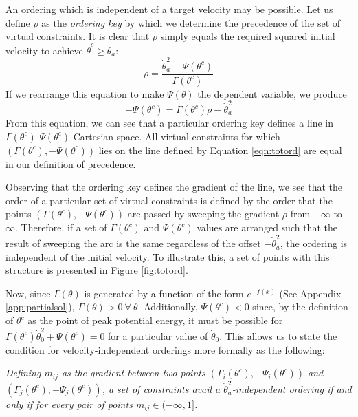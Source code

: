 An ordering which is independent of a target velocity may be possible. Let us define $\rho$ as the \textit{ordering key} by which we determine the precedence of the set of virtual constraints. It is clear that $\rho$ simply equals the required squared initial velocity to achieve $\dot{\theta}^c \geq \dot{\theta}_a$:
\[
	\rho = \frac{\dot{\theta}_a^2 - \Psi(\theta^c)}{\Gamma(\theta^c)}
\]
If we rearrange this equation to make $\Psi(\theta)$ the dependent variable, we produce
\begin{equation} \label{eqn:totord}
	-\Psi(\theta^c) = \Gamma(\theta^c)\rho - \dot{\theta}_a^2
\end{equation}
From this equation, we can see that a particular ordering key defines a line in $\Gamma(\theta^c)$-$\Psi(\theta^c)$ Cartesian space. All virtual constraints for which $(\Gamma(\theta^c), -\Psi(\theta^c))$ lies on the line defined by Equation \ref{eqn:totord} are equal in our definition of precedence.



Observing that the ordering key defines the gradient of the line, we see that the order of a particular set of virtual constraints is defined by the order that the points $(\Gamma(\theta^c), -\Psi(\theta^c))$ are passed by sweeping the gradient $\rho$ from $-\infty$ to $\infty$. Therefore, if a set of $\Gamma(\theta^c)$ and $\Psi(\theta^c)$ values are arranged such that the result of sweeping the arc is the same regardless of the offset $-\dot{\theta}_a^2$, the ordering is independent of the initial velocity. To illustrate this, a set of points with this structure is presented in Figure \ref{fig:totord}. 

Now, since $\Gamma(\theta)$ is generated by a function of the form $e^{-f(x)}$ (See Appendix \ref{app:partialsol}), $\Gamma(\theta)>0 ~ \forall ~ \theta$. Additionally, $\Psi(\theta^c)<0$ since, by the definition of $\theta^c$ as the point of peak potential energy, it must be possible for $\Gamma(\theta^c)\dot{\theta}_0^2 + \Psi(\theta^c) = 0$ for a particular value of $\dot{\theta}_0$. This allows us to state the condition for velocity-independent orderings more formally as the following:

\emph{Defining $m_{ij}$ as the gradient between two points $\left(\Gamma_i(\theta^c), -\Psi_i(\theta^c)\right)$ and $\left(\Gamma_j(\theta^c), -\Psi_j(\theta^c)\right)$, a set of constraints avail a $\dot{\theta}_a^2$-independent ordering if and only if for every pair of points $m_{ij}\in(-\infty,1]$.}

